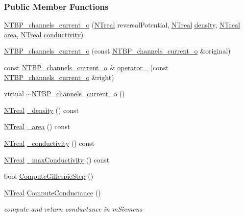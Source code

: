 \subsubsection*{Public Member Functions}
\begin{DoxyCompactItemize}
\item 
\hyperlink{class_n_t_b_p__channels__current__o_a2686cc84f08591900f708031acb7f1d2}{NTBP\_\-channels\_\-current\_\-o} (\hyperlink{nt__types_8h_a814a97893e9deb1eedcc7604529ba80d}{NTreal} reversalPotential, \hyperlink{nt__types_8h_a814a97893e9deb1eedcc7604529ba80d}{NTreal} \hyperlink{class_n_t_b_p__channels__current__o_a8f486ec47e3aeef298a33b735758aa9f}{density}, \hyperlink{nt__types_8h_a814a97893e9deb1eedcc7604529ba80d}{NTreal} \hyperlink{class_n_t_b_p__channels__current__o_af88f0d6c8df84ab148c87484f39ee2b7}{area}, \hyperlink{nt__types_8h_a814a97893e9deb1eedcc7604529ba80d}{NTreal} \hyperlink{class_n_t_b_p__channels__current__o_a9e93074869bcaabf578ca447196cccbb}{conductivity})
\item 
\hyperlink{class_n_t_b_p__channels__current__o_a05f9faf05996530089b8f363591ea744}{NTBP\_\-channels\_\-current\_\-o} (const \hyperlink{class_n_t_b_p__channels__current__o}{NTBP\_\-channels\_\-current\_\-o} \&original)
\item 
const \hyperlink{class_n_t_b_p__channels__current__o}{NTBP\_\-channels\_\-current\_\-o} \& \hyperlink{class_n_t_b_p__channels__current__o_ad76d582cb06acaa396711d686461601f}{operator=} (const \hyperlink{class_n_t_b_p__channels__current__o}{NTBP\_\-channels\_\-current\_\-o} \&right)
\item 
virtual \hyperlink{class_n_t_b_p__channels__current__o_ae12328d76e8b20245d5ee54364a66b84}{$\sim$NTBP\_\-channels\_\-current\_\-o} ()
\item 
\hyperlink{nt__types_8h_a814a97893e9deb1eedcc7604529ba80d}{NTreal} \hyperlink{class_n_t_b_p__channels__current__o_a583c77a1b897c0dcddd07fbd045bd5ef}{\_\-density} () const 
\item 
\hyperlink{nt__types_8h_a814a97893e9deb1eedcc7604529ba80d}{NTreal} \hyperlink{class_n_t_b_p__channels__current__o_ab5b6c789ecbf96751486e5110a42116e}{\_\-area} () const 
\item 
\hyperlink{nt__types_8h_a814a97893e9deb1eedcc7604529ba80d}{NTreal} \hyperlink{class_n_t_b_p__channels__current__o_acb485c679b6ebef58ffabd93a9625bd6}{\_\-conductivity} () const 
\item 
\hyperlink{nt__types_8h_a814a97893e9deb1eedcc7604529ba80d}{NTreal} \hyperlink{class_n_t_b_p__channels__current__o_a4b34642d321867d2ad58f40c50316dec}{\_\-maxConductivity} () const 
\item 
bool \hyperlink{class_n_t_b_p__channels__current__o_ac72c5e59eed9c5b4fe9ab9efc74ae576}{ComputeGillespieStep} ()
\item 
\hyperlink{nt__types_8h_a814a97893e9deb1eedcc7604529ba80d}{NTreal} \hyperlink{class_n_t_b_p__channels__current__o_a472142e3b4eaba30d098010345861ca1}{ComputeConductance} ()
\begin{DoxyCompactList}\small\item\em compute and return conductance in mSiemens \item\end{DoxyCompactList}\end{DoxyCompactItemize}
